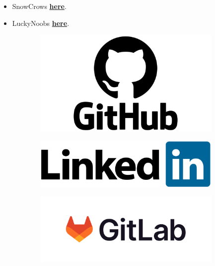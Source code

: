 \documentclass[12pt,a4paper]{article}
\begin{document}
    \begin{itemize}
        \item SnowCrows \href{https://snowcrows.com/}{\textbf{here}}.
        \item LuckyNoobs \href{https://lucky-noobs.com/}{\textbf{here}}.
    \end{itemize}

    \begin{figure}[b]
        \centering
        \begin{subfigure}[b]{0.15\linewidth}
            \href{https://github.com/icharo-tb}{\includegraphics[width=\linewidth]{Images/GitHub-logo.png}}
        \end{subfigure}
        \begin{subfigure}[b]{0.15\linewidth}
            \href{https://www.linkedin.com/in/danielopezpajares/}{\includegraphics[width=\linewidth]{Images/LinkedIn_Logo.png}}
        \end{subfigure}
        \begin{subfigure}[b]{0.15\linewidth}
            \href{https://gitlab.com/daniel.lopez.pajares.2021}{\includegraphics[width=\linewidth]{Images/GitLab_logo.png}}
        \end{subfigure}
    \end{figure}
\end{document}
